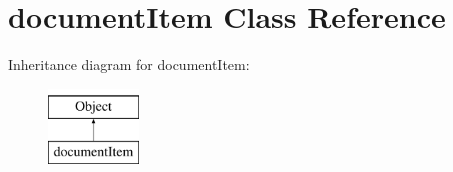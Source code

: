 \hypertarget{classdocumentItem}{}\section{document\+Item Class Reference}
\label{classdocumentItem}
Inheritance diagram for document\+Item\+:\begin{figure}[H]
\begin{center}
\leavevmode
\includegraphics[height=2.000000cm]{classdocumentItem}
\end{center}
\end{figure}
